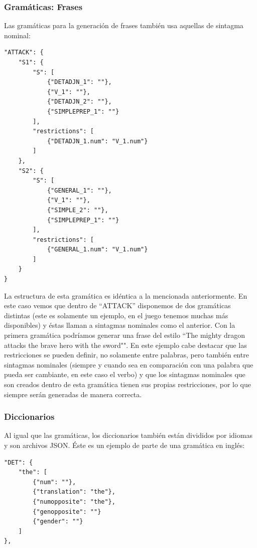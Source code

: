 \subsubsection{Gramáticas: Frases}

Las gramáticas para la generación de frases también usa aquellas de sintagma nominal: 

\begin{lstlisting}[style=json]
"ATTACK": {
	"S1": {
	    "S": [
	        {"DETADJN_1": ""},
	        {"V_1": ""},
	        {"DETADJN_2": ""},
	        {"SIMPLEPREP_1": ""}
	    ],
	    "restrictions": [
	        {"DETADJN_1.num": "V_1.num"}
	    ]
	},
	"S2": {
	    "S": [
	        {"GENERAL_1": ""},
	        {"V_1": ""},
	        {"SIMPLE_2": ""},
	        {"SIMPLEPREP_1": ""}
	    ],
	    "restrictions": [
	        {"GENERAL_1.num": "V_1.num"}
	    ]
	}
}
\end{lstlisting}

La estructura de esta gramática es idéntica a la mencionada anteriormente. En este caso vemos que dentro de ``ATTACK'' disponemos de dos gramáticas distintas (este es solamente un ejemplo, en el juego tenemos muchas más disponibles) y éstas llaman a sintagmas nominales como el anterior.
Con la primera gramática podríamos generar una frase del estilo ``The mighty dragon attacks the brave hero with the sword"". En este ejemplo cabe destacar que las restricciones se pueden definir, no solamente entre palabras, pero también entre sintagmas nominales (siempre y cuando sea en comparación con una palabra que pueda ser cambiante, en este caso el verbo) y que los sintagmas nominales que son creados dentro de esta gramática tienen sus propias restricciones, por lo que siempre serán generadas de manera correcta.

\subsubsection{Diccionarios}

Al igual que las gramáticas, los diccionarios también están divididos por idiomas y son archivos JSON. Éste es un ejemplo de parte de una gramática en inglés:

\begin{lstlisting}[style=json]
"DET": {
    "the": [
        {"num": ""},
        {"translation": "the"},
        {"numopposite": "the"},
        {"genopposite": ""}
        {"gender": ""}
    ]
},
\end{lstlisting}

